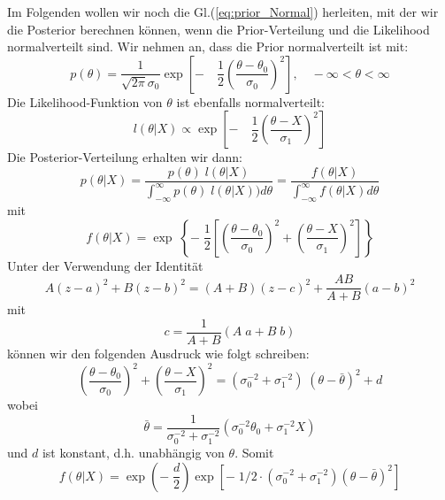 Im Folgenden wollen wir noch die Gl.(\ref{eq:prior_Normal}) herleiten, mit der 
wir die Posterior berechnen können, wenn die Prior-Verteilung und die Likelihood 
normalverteilt sind.
Wir nehmen an, dass die Prior normalverteilt ist mit: 
\begin{equation}
p(\theta) = \frac{1}{\sqrt{2\pi}\sigma_0}\exp\left[-\quad 
\frac{1}{2}\left(\frac{\theta-\theta_0}{\sigma_0}\right)^2\right], 
\quad -\infty < \theta < \infty
\end{equation}
Die Likelihood-Funktion von $\theta$ ist ebenfalls normalverteilt: 
\begin{equation}
l(\theta|X) \propto \exp\left[-\quad 
\frac{1}{2}\left(\frac{\theta-X}{\sigma_1}\right)^2\right]
\end{equation}
Die Posterior-Verteilung erhalten wir dann: 
\begin{equation}
p(\theta|X) = \frac{p(\theta)\; l(\theta|X)}{\int_{-\infty}^{\infty} 
p(\theta)\;l(\theta|X))d\theta} = \frac{f(\theta|X)}{\int_{-\infty}^{\infty}
f(\theta|X) d\theta}
\end{equation}
mit 
\begin{equation}
f(\theta|X) = \exp \; \left\lbrace  -\; \frac{1}{2} 
\left[\left(\frac{\theta - \theta_0}{\sigma_0}\right)^2 + 
\left(\frac{\theta -X}{\sigma_1}\right)^2\right]  \right\rbrace 
\end{equation}
Unter der Verwendung der Identität
\begin{equation}
A(z-a)^2+B(z-b)^2 = (A+B)(z-c)^2 + \frac{AB}{A+B}(a-b)^2
\end{equation}
mit 
\begin{equation}
c = \frac{1}{A+B}(A\;a+B\;b)
\end{equation}
können wir den folgenden Ausdruck wie folgt schreiben: 
\begin{equation}
\left( \frac{\theta-\theta_0}{\sigma_0}\right)^2 + 
\left(\frac{\theta-X}{\sigma_1}\right)^2 = 
(\sigma_0^{-2} + \sigma_1^{-2}) \; (\theta - \bar{\theta})^2 + d
\end{equation}
wobei
\[
\bar{\theta} = \frac{1}{\sigma_0^{-2}+\sigma_1^{-2}}
(\sigma_0^{-2}\theta_0 + \sigma_1^{-2} X)
\]
und $d$ ist konstant, d.h. unabhängig von $\theta$. 
Somit 
\begin{equation}
f(\theta |X) = \exp \left( -\; \frac{d}{2}\right) \exp [-\; 1/2 \cdot 
(\sigma_0^{-2}+\sigma_1^{-2})(\theta - \bar{\theta})^2]
\end{equation}


